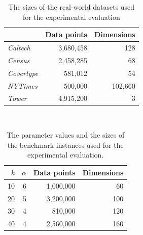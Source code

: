 %
\begin{table}
	\begin{center}%
	\caption{The sizes of the real-world datasets used for the experimental evaluation}
	\label{tab:real-world-datasets-overview}
	\begin{tabular}{lrr}
		\toprule
        
		    & Data points
		    & Dimensions
            \\
		\midrule
		\textit{Caltech}
    		& 3,680,458
    		& 128
    		\\
		\textit{Census}
    		& 2,458,285
    		& 68
    		\\
	    \textit{Covertype}
    	    & 581,012
    		& 54
    		\\
	    \textit{NYTimes}
    	    & 500,000
    		& 102,660
    		\\
        \textit{Tower}
            & 4,915,200
    		& 3
    		\\
		\bottomrule
	\end{tabular}\\
	\end{center}
\end{table}



%
\begin{table}
	\begin{center}%
	\caption{The parameter values and the sizes of the benchmark instances used for the experimental evaluation.}
	\label{tab:benchmark-instances-overview}
	\begin{tabular}{rrrr}
		\toprule
        $k$
		    & $\alpha$
		    & Data points
		    & Dimensions
            \\
		\midrule
        10
    		& 6
    		& 1,000,000
    		& 60
    		\\
        20
    		& 5
    		& 3,200,000
    		& 100
    		\\
        30
    		& 4
    		& 810,000
    		& 120
    		\\
        40
    		& 4
    		& 2,560,000
    		& 160
    		\\
		\bottomrule
	\end{tabular}\\
	\end{center}
\end{table}


